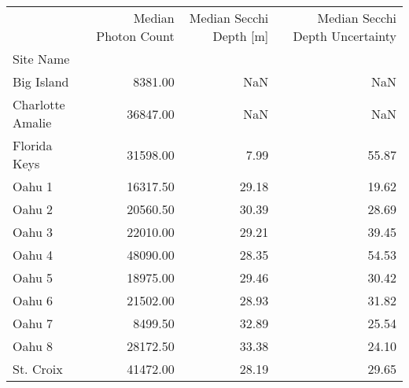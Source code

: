 \begin{tabular}{lrrr}
\toprule
{} &  Median Photon Count &  Median Secchi Depth [m] &  Median Secchi Depth Uncertainty \\
Site Name        &                      &                          &                                  \\
\midrule
Big Island       &              8381.00 &                      NaN &                              NaN \\
Charlotte Amalie &             36847.00 &                      NaN &                              NaN \\
Florida Keys     &             31598.00 &                     7.99 &                            55.87 \\
Oahu 1           &             16317.50 &                    29.18 &                            19.62 \\
Oahu 2           &             20560.50 &                    30.39 &                            28.69 \\
Oahu 3           &             22010.00 &                    29.21 &                            39.45 \\
Oahu 4           &             48090.00 &                    28.35 &                            54.53 \\
Oahu 5           &             18975.00 &                    29.46 &                            30.42 \\
Oahu 6           &             21502.00 &                    28.93 &                            31.82 \\
Oahu 7           &              8499.50 &                    32.89 &                            25.54 \\
Oahu 8           &             28172.50 &                    33.38 &                            24.10 \\
St. Croix        &             41472.00 &                    28.19 &                            29.65 \\
\bottomrule
\end{tabular}
